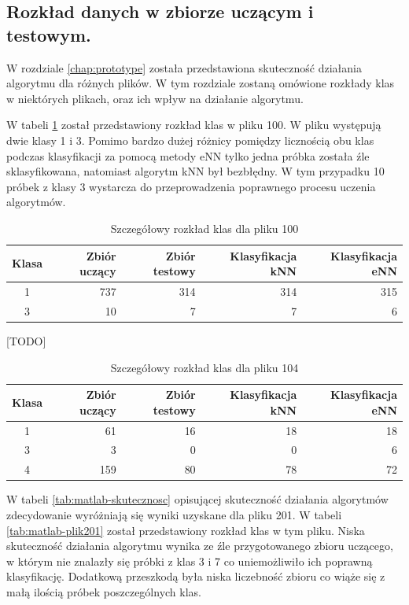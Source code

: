 \subsection{Rozkład danych w zbiorze uczącym i testowym.}
W rozdziale \ref{chap:prototype} została przedstawiona skuteczność działania algorytmu dla różnych plików. W tym rozdziale zostaną omówione rozkłady klas w niektórych plikach, oraz ich wpływ na działanie algorytmu.


W tabeli \ref{tab:matlab-plik100} został przedstawiony rozkład klas w pliku 100. W pliku występują dwie klasy 1 i 3. Pomimo bardzo dużej różnicy pomiędzy licznością obu klas podczas klasyfikacji za pomocą metody eNN tylko jedna próbka została źle sklasyfikowana, natomiast algorytm kNN był bezbłędny. W tym przypadku 10 próbek z klasy 3 wystarcza do przeprowadzenia poprawnego procesu uczenia algorytmów.

\begin{table}[H]
	\centering
	\begin{tabular}{|c|r|r|r|r|}
		\hline
		
		Klasa & Zbiór uczący & Zbiór testowy & Klasyfikacja kNN & Klasyfikacja eNN \\
		\hline
		1 & 737 & 314 & 314 & 315 \\
		\hline 
		3 & 10 & 7 & 7 & 6 \\
		\hline
                          
	\end{tabular}
	\caption{Szczegółowy rozkład klas dla pliku 100}
	\label{tab:matlab-plik100}
\end{table}

[TODO]

\begin{table}[H]
	\centering
	\begin{tabular}{|c|r|r|r|r|}
		\hline
		
		Klasa & Zbiór uczący & Zbiór testowy & Klasyfikacja kNN & Klasyfikacja eNN \\
		\hline
		1 & 61 & 16 & 18 & 18 \\
		\hline 
		3 & 3 & 0 & 0 & 6 \\
		\hline
		4 & 159 & 80 & 78 & 72 \\
		\hline
		
	\end{tabular}
	\caption{Szczegółowy rozkład klas dla pliku 104}
	\label{tab:matlab-plik104}
\end{table}


W tabeli \ref{tab:matlab-skutecznosc} opisującej skuteczność działania algorytmów zdecydowanie wyróżniają się wyniki uzyskane dla pliku 201. W tabeli \ref{tab:matlab-plik201} został przedstawiony rozkład klas w tym pliku. Niska skuteczność działania algorytmu wynika ze źle przygotowanego zbioru uczącego, w którym nie znalazły się próbki z klas 3 i 7 co uniemożliwiło ich poprawną klasyfikację. Dodatkową przeszkodą była niska liczebność zbioru co wiąże się z małą ilością próbek poszczególnych klas.

